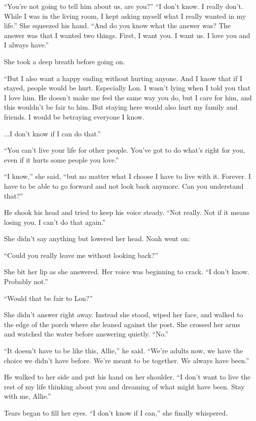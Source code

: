 \documentclass[10pt, twoside, openright]{book}
\begin{document}
``You're not going to tell him about us, are you?'' ``I don't know. I
really don't. While I was in the living room, I kept asking myself what
I really wanted in my life.'' She squeezed his hand. ``And do you know
what the answer was? The answer was that I wanted two things. First, I
want you. I want us. I love you and I always have.''


She took a deep breath before going on.


``But I also want a happy ending without hurting anyone. And I know that
if I stayed, people would be hurt. Especially Lon. I wasn't lying when I
told you that I love him. He doesn't make me feel the same way you do,
but I care for him, and this wouldn't be fair to him. But staying here
would also hurt my family and friends. I would be betraying everyone I
know.


...I don't know if I can do that.''


``You can't live your life for other people. You've got to do what's
right for you, even if it hurts some people you love.''

``I know,'' she said, ``but no matter what I choose I have to live with
it. Forever. I have to be able to go forward and not look back anymore.
Can you understand that?''

He shook his head and tried to keep his voice steady. ``Not really. Not
if it means losing you. I can't do that again.''


She didn't say anything but lowered her head. Noah went on:

``Could you really leave me without looking back?''


She bit her lip as she answered. Her voice was beginning to crack. ``I
don't know. Probably not.''


``Would that be fair to Lon?''


She didn't answer right away. Instead she stood, wiped her face, and
walked to the edge of the porch where she leaned against the post. She
crossed her arms and watched the water before answering quietly. ``No.''

``It doesn't have to be like this, Allie,'' he said. ``We're adults now,
we have the choice we didn't have before. We're meant to be together. We
always have been.''

He walked to her side and put his hand on her shoulder. ``I don't want
to live the rest of my life thinking about you and dreaming of what
might have been. Stay with me, Allie.''

Tears began to fill her eyes. ``I don't know if I can,'' she finally
whispered.
\end{document}
